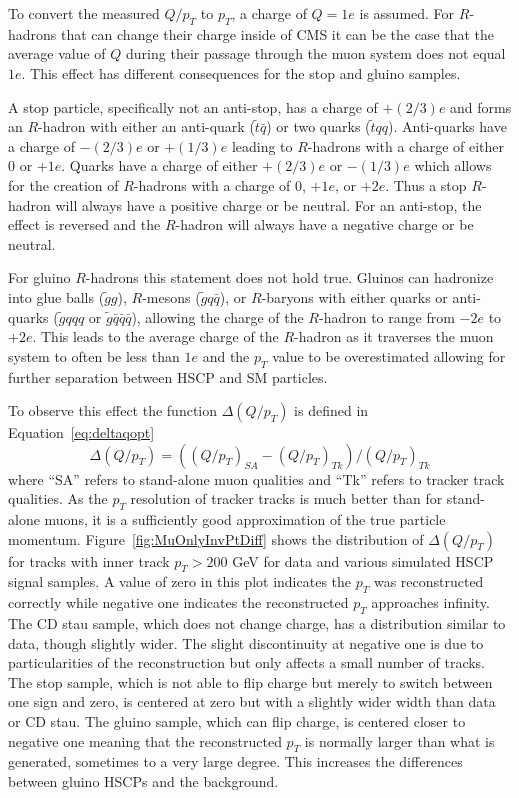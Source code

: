 To convert the measured $Q/p_T$ to $p_T$, a charge of $Q=1e$ is assumed.
For $R$-hadrons that can change their charge inside of CMS it can be the case that the average value of $Q$ during their passage through the muon system does not equal $1e$.
This effect has different consequences for the stop and gluino samples.

A stop particle, specifically not an anti-stop, has a charge of $+(2/3)e$ and forms an $R$-hadron with either an anti-quark ($\tilde{t} \bar{q}$) or
two quarks  ($\tilde{t} q q$). Anti-quarks have a charge of $-(2/3)e$ or $+(1/3)e$ leading to $R$-hadrons with a charge
of either 0 or $+1e$. Quarks have a charge of either $+(2/3)e$ or $-(1/3)e$ which allows for
the creation of $R$-hadrons with a charge of 0, $+1e$, or $+2e$. Thus a stop $R$-hadron will always have a
positive charge or be neutral. For an anti-stop, the effect is reversed and the $R$-hadron will always have a
negative charge or be neutral.

For gluino $R$-hadrons this statement does not hold true. Gluinos can hadronize into glue balls ($\tilde{g}g$), $R$-mesons ($\tilde{g} q \bar{q}$), or
$R$-baryons  with either quarks or anti-quarks ($\tilde{g} qqq$ or $\tilde{g} \bar{q}\bar{q}\bar{q}$),
allowing the charge of the $R$-hadron to range from $-2e$ to $+2e$. This leads to the
average charge of the $R$-hadron as it traverses the muon system to often be less than $1e$ and the $p_T$ value to be overestimated allowing for further separation
between HSCP and SM particles.

To observe this effect the function
$\Delta(Q/p_T)$ is defined in Equation~\ref{eq:deltaqopt}
\begin{equation}
\Delta(Q/p_T) = ((Q/p_T)_{SA} - (Q/p_T)_{Tk})/(Q/p_T)_{Tk}
\label{eq:deltaqopt}
\end{equation}
where ``SA'' refers to stand-alone muon qualities and ``Tk'' refers to
tracker track qualities. As the $p_T$ resolution of tracker tracks is much better than for stand-alone muons, it is a sufficiently good approximation
of the true particle momentum. Figure~\ref{fig:MuOnlyInvPtDiff} shows the distribution of
$\Delta(Q/p_T)$ for tracks with inner track $p_T > 200$ GeV
for data and various simulated HSCP signal samples.
A value of zero in this plot indicates the $p_T$ was reconstructed correctly
while negative one indicates the reconstructed $p_T$ approaches infinity.
The CD stau sample, which does not change charge,
has a distribution similar to data, though slightly wider.
The slight discontinuity at negative one is due to particularities of the reconstruction but only affects a small number of tracks.
The stop sample, which is not able to flip charge but merely to switch
between one sign and zero, is centered at zero but with a slightly wider
width than data or CD stau.
The gluino sample, which can flip charge, is centered closer to negative one meaning that
the reconstructed $p_T$ is normally larger than what is generated, sometimes
to a very large degree. This increases the differences between gluino HSCPs and the background.

